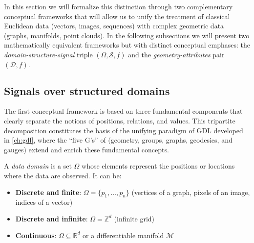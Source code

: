 In this section we will formalize this distinction through two complementary conceptual frameworks that will allow us to unify the treatment of classical Euclidean data (vectors, images, sequences) with complex geometric data (graphs, manifolds, point clouds). In the following subsections we will present two mathematically equivalent frameworks but with distinct conceptual emphases: the \textit{domain-structure-signal} triple $(\Omega, \mathcal{S}, f)$ and the \textit{geometry-attributes} pair $(\mathcal{D}, f)$.

\subsection{Signals over structured domains}\label{sec:senales_dominios}

The first conceptual framework is based on three fundamental components that clearly separate the notions of positions, relations, and values. This tripartite decomposition constitutes the basis of the unifying paradigm of \gls{GDL} developed in \autoref{ch:gdl}, where the ``five G's'' of \citet{bronstein2017geometricdeeplearning} (geometry, groups, graphs, geodesics, and gauges) extend and enrich these fundamental concepts.

\begin{definition}\label{def:dominio_datos}
A \textit{data domain} is a set $\Omega$ whose elements represent the positions or locations where the data are observed. It can be:
\begin{itemize}
	\item \textbf{Discrete and finite}: $\Omega = \{p_1, \ldots, p_n\}$ (vertices of a graph, pixels of an image, indices of a vector)
	\item \textbf{Discrete and infinite}: $\Omega = \mathbb{Z}^d$ (infinite grid)
	\item \textbf{Continuous}: $\Omega \subseteq \mathbb{R}^d$ or a differentiable manifold $\mathcal{M}$
\end{itemize}
\end{definition}


